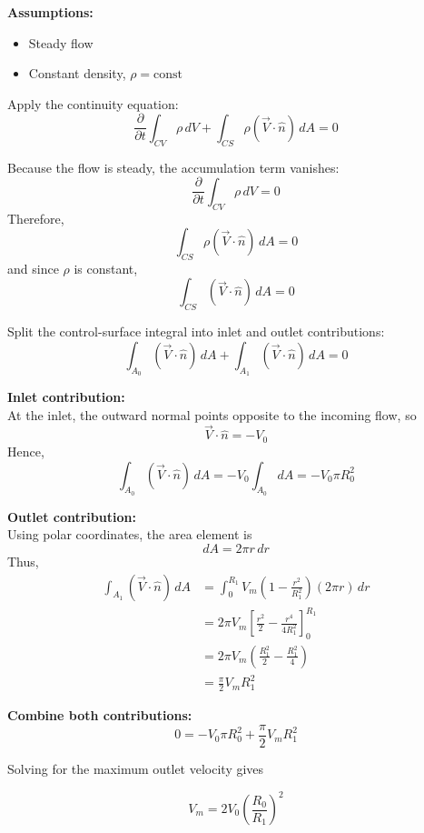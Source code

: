 \textbf{Assumptions:}
\begin{itemize}
    \item Steady flow
    \item Constant density, $\rho=\text{const}$
\end{itemize}

Apply the continuity equation:
\begin{equation}
    \frac{\partial}{\partial t}\int_{CV}\rho\,dV
    +
    \int_{CS}\rho(\vec{V}\cdot\hat{n})\,dA
    =
    0
\end{equation}

Because the flow is steady, the accumulation term vanishes:
\begin{equation}
    \frac{\partial}{\partial t}\int_{CV}\rho\,dV=0
\end{equation}
Therefore,
\begin{equation}
    \int_{CS}\rho(\vec{V}\cdot\hat{n})\,dA=0
\end{equation}
and since $\rho$ is constant,
\begin{equation}
    \int_{CS}(\vec{V}\cdot\hat{n})\,dA=0
\end{equation}

Split the control-surface integral into inlet and outlet contributions:
\begin{equation}
    \int_{A_0}(\vec{V}\cdot\hat{n})\,dA
    +
    \int_{A_1}(\vec{V}\cdot\hat{n})\,dA
    =
    0
\end{equation}

\textbf{Inlet contribution:} \\
At the inlet, the outward normal points opposite to the incoming flow, so
\begin{equation}
    \vec{V}\cdot\hat{n}=-V_0
\end{equation}
Hence,
\begin{equation}
    \int_{A_0}(\vec{V}\cdot\hat{n})\,dA
    =
    -V_0\int_{A_0}dA
    =
    -V_0\pi R_0^2
\end{equation}

\textbf{Outlet contribution:} \\
Using polar coordinates, the area element is
\begin{equation}
    dA = 2\pi r\,dr
\end{equation}
Thus,
\begin{align*}
    \int_{A_1}(\vec{V}\cdot\hat{n})\,dA
    &=
    \int_0^{R_1}
    V_m\left(1-\frac{r^2}{R_1^2}\right)(2\pi r)\,dr \\
    &=
    2\pi V_m
    \left[
        \frac{r^2}{2}-\frac{r^4}{4R_1^2}
    \right]_0^{R_1} \\
    &=
    2\pi V_m
    \left(
        \frac{R_1^2}{2}-\frac{R_1^2}{4}
    \right) \\
    &=
    \frac{\pi}{2}V_m R_1^2
\end{align*}

\textbf{Combine both contributions:}
\begin{equation}
    0 = -V_0\pi R_0^2 + \frac{\pi}{2}V_m R_1^2
\end{equation}

Solving for the maximum outlet velocity gives
\begin{resultbox}
\begin{equation*}
    V_m = 2V_0\left(\frac{R_0}{R_1}\right)^2
\end{equation*}
\end{resultbox}